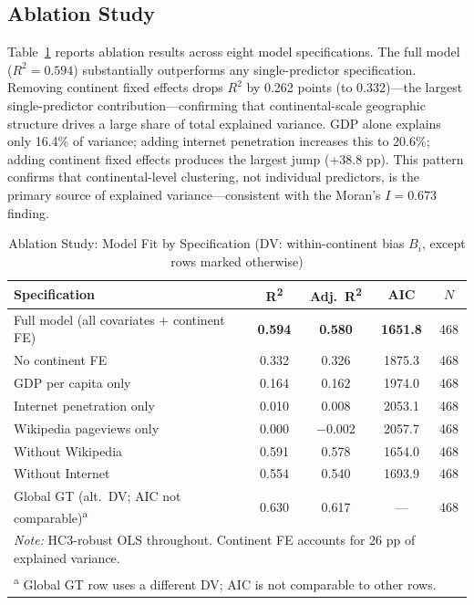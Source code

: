 \documentclass[12pt]{article}
\begin{document}
\subsection{Ablation Study}
\label{sec:ablation}

Table~\ref{tab:ablation} reports ablation results across eight model specifications. The full model ($R^2 = 0.594$) substantially outperforms any single-predictor specification. Removing continent fixed effects drops $R^2$ by 0.262 points (to 0.332)---the largest single-predictor contribution---confirming that continental-scale geographic structure drives a large share of total explained variance. GDP alone explains only 16.4\% of variance; adding internet penetration increases this to 20.6\%; adding continent fixed effects produces the largest jump (+38.8 pp). This pattern confirms that continental-level clustering, not individual predictors, is the primary source of explained variance---consistent with the Moran's $I = 0.673$ finding.

\begin{table}[htbp]
\caption{Ablation Study: Model Fit by Specification (DV: within-continent bias $B_i$, except rows marked otherwise)}
\label{tab:ablation}
\centering
\begin{tabular}{lcccc}
\toprule
Specification & R\textsuperscript{2} & Adj.\ R\textsuperscript{2} & AIC & $N$ \\
\midrule
Full model (all covariates + continent FE) & \textbf{0.594} & \textbf{0.580} & \textbf{1651.8} & 468 \\
No continent FE & 0.332 & 0.326 & 1875.3 & 468 \\
GDP per capita only & 0.164 & 0.162 & 1974.0 & 468 \\
Internet penetration only & 0.010 & 0.008 & 2053.1 & 468 \\
Wikipedia pageviews only & 0.000 & $-$0.002 & 2057.7 & 468 \\
Without Wikipedia & 0.591 & 0.578 & 1654.0 & 468 \\
Without Internet & 0.554 & 0.540 & 1693.9 & 468 \\
Global GT (alt.\ DV; AIC not comparable)\textsuperscript{a} & 0.630 & 0.617 & --- & 468 \\
\bottomrule
\multicolumn{5}{l}{\textit{Note:} HC3-robust OLS throughout. Continent FE accounts for 26 pp of explained variance.} \\
\multicolumn{5}{l}{\textsuperscript{a} Global GT row uses a different DV; AIC is not comparable to other rows.} \\
\end{tabular}
\end{table}
\end{document}
